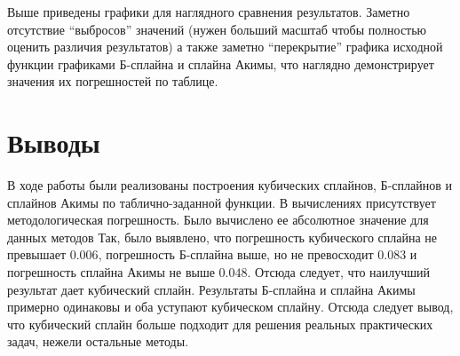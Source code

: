 \documentclass[12pt]{article}
\begin{document}
	Выше приведены графики для наглядного сравнения результатов. Заметно отсутствие ``выбросов'' значений (нужен больший масштаб чтобы полностью оценить различия результатов) а также заметно ``перекрытие'' графика исходной функции графиками Б-сплайна и сплайна Акимы, что наглядно демонстрирует значения их погрешностей по таблице.



    {
        \section{Выводы}
        
    }
	В ходе работы были реализованы построения кубических сплайнов, Б-сплайнов и сплайнов Акимы по таблично-заданной функции. В вычислениях присутствует методологическая погрешность. Было вычислено ее абсолютное значение для данных методов Так, было выявлено, что погрешность кубического сплайна не превышает $0.006$, погрешность Б-сплайна выше, но не превосходит $0.083$ и погрешность сплайна Акимы не выше $0.048$. Отсюда следует, что наилучший результат дает кубический сплайн. Результаты Б-сплайна и сплайна Акимы примерно одинаковы и оба уступают кубическом сплайну. Отсюда следует вывод, что кубический сплайн больше подходит для решения реальных практических задач, нежели остальные методы.
    
   
    
\end{document}
